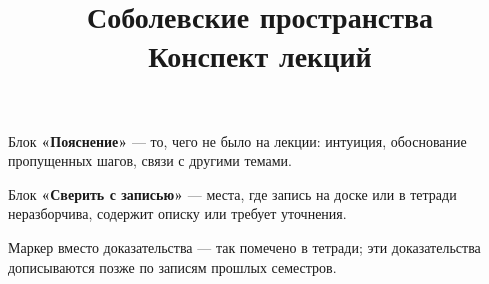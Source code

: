 \documentclass[12pt,a4paper]{article}
\title{\textbf{Соболевские пространства}\\[0.3em]\large Конспект лекций}
\author{}
\date{}
\begin{document}
\maketitle
\thispagestyle{empty}

\begin{idea}[title={Обозначения в конспекте}]
Блок \textbf{«Пояснение»} — то, чего не было на лекции: интуиция, обоснование
пропущенных шагов, связи с другими темами.

\medskip
Блок \textbf{«Сверить с записью»} — места, где запись на доске или в тетради
неразборчива, содержит описку или требует уточнения.

\medskip
Маркер \plusplus{} вместо доказательства — так помечено в тетради; эти доказательства
дописываются позже по записям прошлых семестров.
\end{idea}

\tableofcontents
\newpage



\newpage
\renewcommand{\thesubsection}{\S\arabic{subsection}}




\newpage








\end{document}
